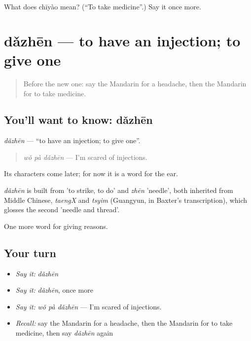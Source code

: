 \begin{tcolorbox}[breakable,colback=teal!4,colframe=teal!35!black,title={Before you move on}]
What does chīyào mean? (\textquotedblleft{}To take medicine\textquotedblright{}.) Say it once more.
\end{tcolorbox}
\section[dǎzhēn]{dǎzhēn — to have an injection; to give one}

\label{lesson:ZH-C228-dazhen}



\begin{quote}
Before the new one: say the Mandarin for a headache, then the Mandarin for to take medicine.
\end{quote}

\subsection*{You'll want to know: dǎzhēn}
\emph{dǎzhēn} — \textquotedblleft{}to have an injection; to give one\textquotedblright{}.

\begin{quote}
\emph{wǒ pà dǎzhēn} — I'm scared of injections.
\end{quote}

Its characters come later; for now it is a word for the ear.

\begin{cousinweb}
\emph{dǎzhēn} is built from  'to strike, to do' and \emph{zhēn} 'needle', both inherited from Middle Chinese, \emph{taengX} and \emph{tsyim} (Guangyun, in Baxter's transcription), which glosses the second 'needle and thread'.
\end{cousinweb}

\begin{grammarlens}[title={What you've built}]
One more word for giving reasons.
\end{grammarlens}

\subsection*{Your turn}
\begin{itemize}
\raggedright
  \item \emph{Say it:} \emph{dǎzhēn}
  \item \emph{Say it:} \emph{dǎzhēn}, once more
  \item \emph{Say it:} \emph{wǒ pà dǎzhēn} — I'm scared of injections.
  \item \emph{Recall:} say the Mandarin for a headache, then the Mandarin for to take medicine, then say \emph{dǎzhēn} again
\end{itemize}

